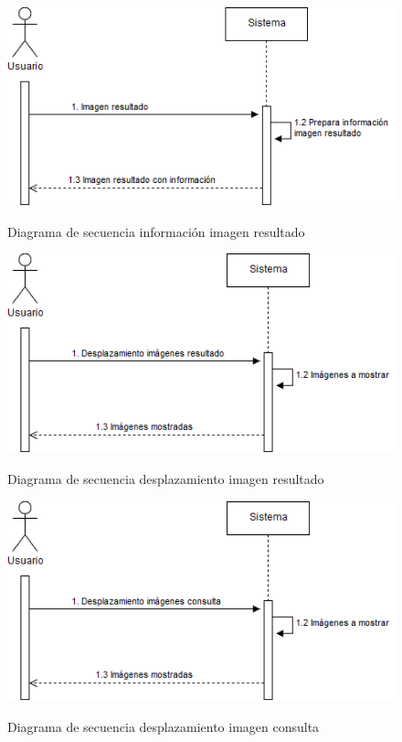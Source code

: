 \begin{figure}[H] %
\centering
\includegraphics[scale=0.6]{imagenes/imagenResultadoInformacion.png}  %
\label{imagenResultadoInformacion.png}
\caption{Diagrama de secuencia información imagen resultado}
\end{figure}

\begin{figure}[H] %
\centering
\includegraphics[scale=0.6]{imagenes/desplazamientoResultado.png}  %
\label{desplazamientoResultado.png}
\caption{Diagrama de secuencia desplazamiento imagen resultado}
\end{figure}

\begin{figure}[H] %
\centering
\includegraphics[scale=0.6]{imagenes/desplazamientoConsulta.png}  %
\label{desplazamientoConsulta.png}
\caption{Diagrama de secuencia desplazamiento imagen consulta}
\end{figure}




